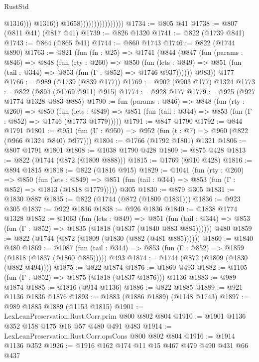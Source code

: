 \begin{lexlean}{RustStd}
\begin{coremodule}
                                              @1316)))
                                        @1316))
                                    @1658))))))))))))))))
@1734 := @805 @41
@1738 := @807 (@811 @41) (@817 @41)
@1739 := @826 @1320
@1741 := @822 (@1739 @841)
@1743 := @864 (@865 @41)
@1744 := @860 @1743
@1746 := @822 (@1744 @890)
@1763 := @821
    (fun (fn : @25) =>
    @1741
      (@844
        (@847
          (fun (params : @846) =>
          @848
            (fun (rty : @260) =>
            @850
              (fun (lets : @849) =>
              @851 (fun (tail : @344) => @853 (fun (Γ : @852) => @1746 @937))))))
        @983))
    @177
@1766 := @989 (@1739 (@839 @177))
@1769 := @902 (@903 @177) @1324
@1773 := @822 (@894 (@1769 @911) @915)
@1774 := @928 @177
@1779 := @925 (@927 @1774 @1328 @883 @885)
@1790 := fun (params : @846) =>
  @848
    (fun (rty : @260) =>
    @850
      (fun (lets : @849) =>
      @851 (fun (tail : @344) => @853 (fun (Γ : @852) => @1746 (@1773 @1779)))))
@1791 := @847 @1790
@1792 := @844 @1791
@1801 := @951 (fun (U : @950) => @952 (fun (t : @7) => @960 (@822 (@966 @1324 @840) @977)))
@1804 := @1766 (@1792 @1801) @1321
@1806 := @807 @1791 @1801
@1808 := @1038 @1790 @428
@1809 := @875 @428
@1813 := @822 (@1744 (@872 (@1809 @888)))
@1815 := @1769 (@910 @428)
@1816 := @894 @1815
@1818 := @822 (@1816 @915)
@1829 := @1041
    (fun (rty : @260) =>
    @850
      (fun (lets : @849) =>
      @851 (fun (tail : @344) => @853 (fun (Γ : @852) => @1813 (@1818 @1779)))))
    @305
@1830 := @879 @305
@1831 := @1830 @887
@1835 := @822 (@1744 (@872 (@1809 @1831)))
@1836 := @923 @305
@1837 := @922 @1836
@1838 := @926 @1836
@1840 := @1838 @1774 @1328
@1852 := @1063
    (fun (lets : @849) =>
    @851 (fun (tail : @344) => @853 (fun (Γ : @852) => @1835 (@1818 (@1837 (@1840 @883 @885))))))
    @480
@1859 := @822 (@1744 (@872 (@1809 (@1830 (@882 (@481 @885))))))
@1860 := @1840 @480
@1869 := @1087
    (fun (tail : @344) => @853 (fun (Γ : @852) => @1859 (@1818 (@1837 (@1860 @885)))))
    @493
@1874 := @1744 (@872 (@1809 (@1830 (@882 @494))))
@1875 := @822 @1874
@1876 := @1860 @493
@1882 := @1105 (fun (Γ : @852) => @1875 (@1818 (@1837 @1876))) @1136
@1883 := @989 @1874
@1885 := @1816 (@914 @1136)
@1886 := @822 @1885
@1889 := @921 @1136 @1836 @1876
@1893 := @1883 (@1886 @1889) (@1148 @1743)
@1897 := @989 @1885 @1889 (@1153 @1815)
@1901 := LexLeanPreservation.Rust.Corr.prim @800 @802 @804
@1910 := @1901 @1136 @352 @158 @175 @16 @57 @480 @491 @483
@1914 := LexLeanPreservation.Rust.Corr.opsCons @800 @802 @804
@1916 := @1914 @1136 @352
@1926 := @1916 @162 @174 @11 @15 @467 @479 @490 @431 @66 @437

\end{coremodule}
\end{lexlean}
